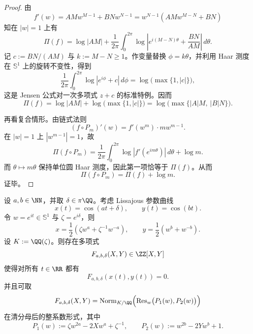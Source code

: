 \begin{proof}
由
\[
f'(w)=AMw^{M-1}+BNw^{N-1}=w^{N-1}(AMw^{M-N}+BN)
\]
知在 \(|w|=1\) 上有
\[
\Pi(f)
=
\log|AM|
+
\frac{1}{2\pi}\int_0^{2\pi}
\log\left|e^{i(M-N)\theta}+\frac{BN}{AM}\right|\,d\theta.
\]
记 \(c:=BN/(AM)\) 与 \(k:=M-N\ge 1\)。作变量替换 \(\phi=k\theta\)，并利用 Haar 测度在 \(\mathbb S^1\) 上的旋转不变性，得到
\[
\frac{1}{2\pi}\int_0^{2\pi}\log|e^{i\phi}+c|\,d\phi
=
\log\bigl(\max\{1,|c|\}\bigr),
\]
这是 Jensen 公式对一次多项式 \(z+c\) 的标准特例。因而
\[
\Pi(f)
=
\log|AM|+\log\bigl(\max\{1,|c|\}\bigr)
=
\log\bigl(\max\{|A|M,\ |B|N\}\bigr).
\]

再看复合情形。由链式法则
\[
(f\circ P_m)'(w)=f'(w^m)\cdot mw^{m-1}.
\]
在 \(|w|=1\) 上 \(|w^{m-1}|=1\)，故
\[
\Pi(f\circ P_m)
=
\frac{1}{2\pi}\int_0^{2\pi}\log|f'(e^{im\theta})|\,d\theta+\log m.
\]
而 \(\theta\mapsto m\theta\) 保持单位圆 Haar 测度，因此第一项恰等于 \(\Pi(f)\)。从而
\[
\Pi(f\circ P_m)=\Pi(f)+\log m.
\]
证毕。
\end{proof}

\begin{proposition}\label{prop:derived-lissajous-cyclotomic-resultant}
设 \(a,b\in\NN\)，并取 \(\delta\in\pi\QQ\)。考虑 Lissajous 参数曲线
\[
x(t)=\cos(at+\delta),
\qquad
y(t)=\cos(bt).
\]
令 \(w=e^{it}\in\mathbb S^1\) 与 \(\zeta=e^{i\delta}\)，则
\[
x=\frac12(\zeta w^a+\zeta^{-1}w^{-a}),
\qquad
y=\frac12(w^b+w^{-b}).
\]
设 \(K:=\QQ(\zeta)\)。则存在多项式
\[
F_{a,b,\delta}(X,Y)\in\ZZ[X,Y]
\]
使得对所有 \(t\in\RR\) 都有
\[
F_{a,b,\delta}(x(t),y(t))=0.
\]
并且可取
\[
F_{a,b,\delta}(X,Y)
=
\operatorname{Norm}_{K/\QQ}
\Bigl(
\operatorname{Res}_{w}\bigl(P_1(w),P_2(w)\bigr)
\Bigr)
\]
在清分母后的整系数形式，其中
\[
P_1(w):=\zeta w^{2a}-2Xw^a+\zeta^{-1},
\qquad
P_2(w):=w^{2b}-2Yw^b+1.
\]
\end{proposition}


